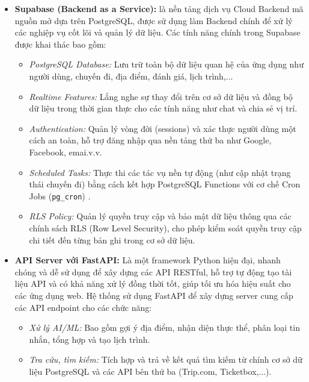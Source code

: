 \begin{itemize}
    \item \textbf{Supabase (Backend as a Service)\cite{supabase_doc}:}
    là nền tảng dịch vụ Cloud Backend mã nguồn mở dựa trên PostgreSQL, được sử dụng làm Backend chính để xử lý các nghiệp vụ cốt lõi và quản lý dữ liệu. Các tính năng chính trong Supabase được khai thác bao gồm:
        \begin{itemize}
            \item \textit{PostgreSQL Database:} Lưu trữ toàn bộ dữ liệu quan hệ của ứng dụng như người dùng, chuyến đi, địa điểm, đánh giá, lịch trình,...
                        \item \textit{Realtime Features:} Lắng nghe sự thay đổi trên cơ sở dữ liệu và đồng bộ dữ liệu trong thời gian thực cho các tính năng như chat và chia sẻ vị trí.
                        \item \textit{Authentication:} Quản lý vòng đời (sessions) và xác thực người dùng một cách an toàn, hỗ trợ đăng nhập qua nền tảng thứ ba như Google, Facebook, emai.v.v.
                        \item \textit{Scheduled Tasks:} Thực thi các tác vụ nền tự động (như cập nhật trạng thái chuyến đi) bằng cách kết hợp PostgreSQL Functions với cơ chế Cron Jobs (\texttt{pg\_cron}) .
                        \item \textit{RLS Policy:}  Quản lý quyền truy cập và bảo mật dữ liệu thông qua các chính sách RLS (Row Level Security), cho phép kiểm soát quyền truy cập chi tiết đến từng bản ghi trong cơ sở dữ liệu.
        \end{itemize}

    \item \textbf{API Server với FastAPI\cite{fastapi_doc}:}
 Là một framework Python hiện đại, nhanh chóng và dễ sử dụng để xây dựng các API RESTful, hỗ trợ tự động tạo tài liệu API và có khả năng xử lý đồng thời tốt, giúp tối ưu hóa hiệu suất cho các ứng dụng web. Hệ thống sử dụng FastAPI để xây dựng server cung cấp các API endpoint cho các chức năng:
        \begin{itemize}
             \item \textit{Xử lý AI/ML:} Bao gồm gợi ý địa điểm, nhận diện thực thể, phân loại tin nhắn, tổng hợp và tạo lịch trình.
             \item \textit{Tra cứu, tìm kiếm:} Tích hợp và trả về kết quả tìm kiếm từ chính cơ sở dữ liệu PostgreSQL và các API bên thứ ba (Trip.com, Ticketbox,...).
        \end{itemize}
        

\end{itemize}

